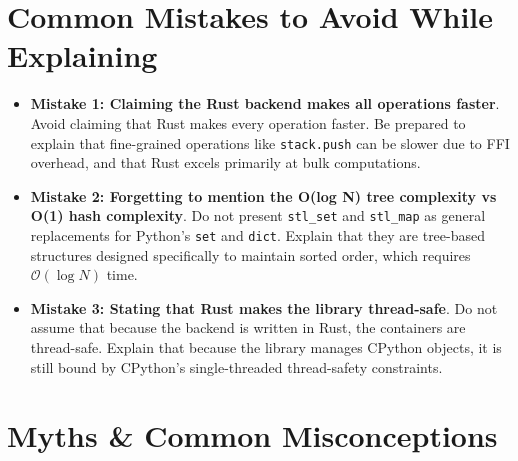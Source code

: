 \documentclass[11pt,a4paper]{article}
\begin{document}
\section{Common Mistakes to Avoid While Explaining}

\begin{itemize}
    \item \textbf{Mistake 1: Claiming the Rust backend makes all operations faster}.
    Avoid claiming that Rust makes every operation faster. Be prepared to explain that fine-grained operations like \texttt{stack.push} can be slower due to FFI overhead, and that Rust excels primarily at bulk computations.
    
    \item \textbf{Mistake 2: Forgetting to mention the O(log N) tree complexity vs O(1) hash complexity}.
    Do not present \texttt{stl\_set} and \texttt{stl\_map} as general replacements for Python's \texttt{set} and \texttt{dict}. Explain that they are tree-based structures designed specifically to maintain sorted order, which requires $\mathcal{O}(\log N)$ time.
    
    \item \textbf{Mistake 3: Stating that Rust makes the library thread-safe}.
    Do not assume that because the backend is written in Rust, the containers are thread-safe. Explain that because the library manages CPython objects, it is still bound by CPython's single-threaded thread-safety constraints.
\end{itemize}

\section{Myths \& Common Misconceptions}
\end{document}
